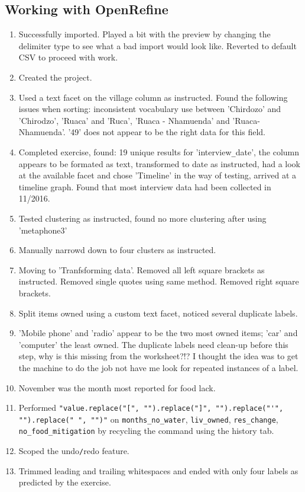 \documentclass{article}
\begin{document}
\subsection{Working with OpenRefine}
\begin{enumerate}
    \item Successfully imported. Played a bit with the preview by changing the delimiter type to see what a bad import would look like. Reverted to default CSV to proceed with work.
    \item Created the project.
    \item Used a text facet on the village column as instructed. Found the following issues when sorting: inconsistent vocabulary use between 'Chirdozo' and 'Chirodzo', 'Ruaca' and 'Ruca', 'Ruaca - Nhamuenda' and 'Ruaca-Nhamuenda'. '49' does not appear to be the right data for this field.
    \item Completed exercise, found: 19 unique results for 'interview\verb|_|date', the column appears to be formated as text, transformed to date as instructed, had a look at the available facet and chose 'Timeline' in the way of testing, arrived at a timeline graph. Found that most interview data had been collected in 11/2016.
    \item Tested clustering as instructed, found no more clustering after using 'metaphone3'
    \item Manually narrowd down to four clusters as instructed.
    \item Moving to 'Tranfsforming data'. Removed all left square brackets as instructed. Removed single quotes using same method. Removed right square brackets.
    \item Split items owned using a custom text facet, noticed several duplicate labels.
    \item 'Mobile phone' and 'radio' appear to be the two most owned items; 'car' and 'computer' the least owned. The duplicate labels need clean-up before this step, why is this missing from the worksheet?!? I thought the idea was to get the machine to do the job not have me look for repeated instances of a label.
    \item November was the month most reported for food lack.
    \item Performed \newline \verb|"value.replace("[", "").replace("]", "").replace("'", "").replace(" ", "")"| on \verb|months_no_water|, \verb|liv_owned|, \verb|res_change|, \verb|no_food_mitigation| by recycling the command using the history tab.
    \item Scoped the undo\verb|/|redo feature.
    \item Trimmed leading and trailing whitespaces and ended with only four labels as predicted by the exercise.
\end{enumerate}
\end{document}
